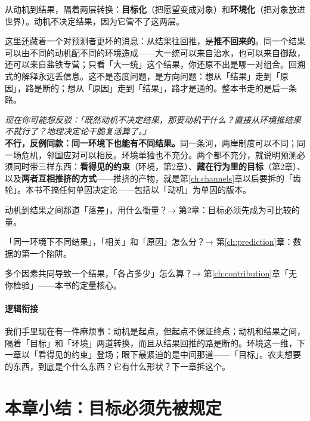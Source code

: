 \documentclass[../../main2.tex]{subfiles}
\begin{document}
	从动机到结果，隔着两层转换：\textbf{目标化}（把愿望变成对象）和\textbf{环境化}（把对象放进世界）。动机不决定结果，因为它管不了这两层。

	这里还藏着一个对预测者更坏的消息：从结果往回推，是\textbf{推不回来的}。同一个结果可以由不同的动机配不同的环境造成——大一统可以来自治水，也可以来自御敌，还可以来自盐铁专营；只看「大一统」这个结果，你还原不出是哪一对组合。回溯式的解释永远丢信息。这不是态度问题，是方向问题：想从「结果」走到「原因」，路是断的；想从「原因」走到「结果」，路才是通的。整本书走的是后一条路。

	\begin{questionbox}
		\textit{现在你可能想反驳：「既然动机不决定结果，那要动机干什么？直接从环境推结果不就行了？地理决定论干脆复活算了。」}\\
		\textbf{不行，反例同款：同一环境下也能有不同结果。}同一条河，两岸制度可以不同；同一场危机，邻国应对可以相反。环境单独也不充分。两个都不充分，就说明预测必须同时带三样东西：\textbf{看得见的约束}（环境，第2章）、\textbf{藏在行为里的目标}（第2章）、以及\textbf{两者互相推挤的方式}——推挤的产物，就是第\ref{ch:channels}章以后要拆的「齿轮」。本书不搞任何单因决定论——包括以「动机」为单因的版本。
	\end{questionbox}

	\begin{reader_anticipation}
		\item 动机到结果之间那道「落差」，用什么衡量？→ 第2章：目标必须先成为可比较的量。
		\item 「同一环境下不同结果」，「相关」和「原因」怎么分？→ 第\ref{ch:prediction}章：数据的第一个陷阱。
		\item 多个因素共同导致一个结果，「各占多少」怎么算？→ 第\ref{ch:contribution}章「无你检验」——本书的定量核心。
	\end{reader_anticipation}

	\paragraph*{逻辑衔接}
	我们手里现在有一件麻烦事：动机是起点，但起点不保证终点；动机和结果之间，隔着「目标」和「环境」两道转换，而且从结果回推的路是断的。环境这一维，下一章以「看得见的约束」登场；眼下最紧迫的是中间那道——「目标」。农夫想要的东西，到底是个什么东西？它有什么形状？下一章拆这个。

	\section{本章小结：目标必须先被规定}
	\label{sec:mot-summary}
\end{document}
